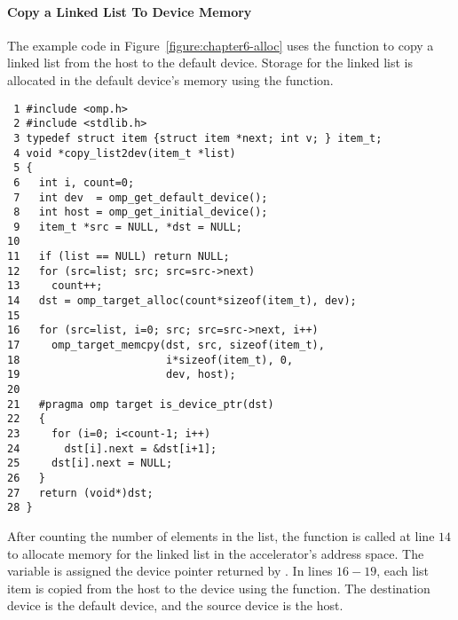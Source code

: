 
\paragraph{Copy a Linked List To Device Memory}

The example code in Figure~\ref{figure:chapter6-alloc} uses 
the  function to
copy a linked list from the host to the default device.  Storage for the linked list is allocated
in the default device's memory using the  function.

\begin{figure*}[!tb]
\begin{verbatim}
 1 #include <omp.h>
 2 #include <stdlib.h>
 3 typedef struct item {struct item *next; int v; } item_t;
 4 void *copy_list2dev(item_t *list)
 5 {
 6   int i, count=0;
 7   int dev  = omp_get_default_device();
 8   int host = omp_get_initial_device();
 9   item_t *src = NULL, *dst = NULL;
10 
11   if (list == NULL) return NULL;
12   for (src=list; src; src=src->next)
13     count++;
14   dst = omp_target_alloc(count*sizeof(item_t), dev);
15   
16   for (src=list, i=0; src; src=src->next, i++)
17     omp_target_memcpy(dst, src, sizeof(item_t),
18                       i*sizeof(item_t), 0,
19                       dev, host);
20                       
21   #pragma omp target is_device_ptr(dst)
22   {
23     for (i=0; i<count-1; i++)
24       dst[i].next = &dst[i+1];
25     dst[i].next = NULL;
26   } 
27   return (void*)dst;
28 } 
\end{verbatim}
\caption{ \textbf {Copy a linked list to device memory} -- \small
          Copy a linked list from the host to dynamically allocated
          device memory.
         }
\label{figure:chapter6-alloc}
\end{figure*}

After counting the number of elements in the list, the 
function is called at line $14$ to allocate memory for the linked list in the
accelerator's address space.   The variable  is assigned the device
pointer returned by .  In lines $16-19$, each list item
is copied from the host to the device using the 
function.  The destination device is the default device, and the source device
is the host.

